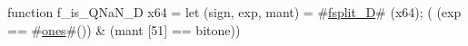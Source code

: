 function f_is_QNaN_D   x64 = {
  let (sign, exp, mant) = #\hyperref[sailRISCVzfsplitzyD]{fsplit\_D}# (x64);
  (  (exp == #\hyperref[sailRISCVzones]{ones}#())
   & (mant [51] == bitone))
}
